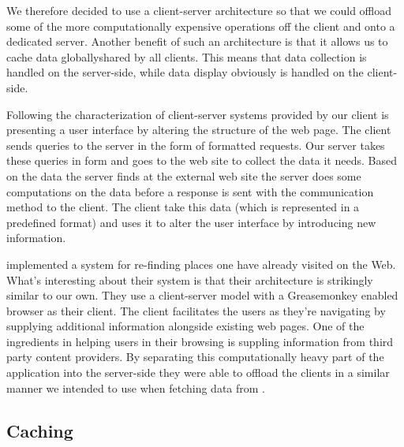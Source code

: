 We therefore decided to use a client-server architecture so that we could
offload some of the more computationally expensive operations off the client
and onto a dedicated server. Another benefit of such an architecture is that
it allows us to cache data globally\dash{}shared by all clients. This means
that data collection is handled on the server-side, while data display
obviously is handled on the client-side.

Following the characterization of client-server systems provided by
\citeauthor{sinha92} our client is presenting a user interface
by altering the structure of the \urort{} web page. The client sends queries
to the server in the form of %
formatted requests. Our server takes these queries in  form
and goes to the \urort{} web site to collect the data it needs. Based on the
data the server finds at the external \urort{} web site the server does some
computations on the data before a response is sent
with the  communication method to the client. The client take this
data (which is represented in a predefined format) and uses it to alter the
user interface by introducing new information.

\citet[--888]{nishimoto06} implemented a system for re-finding places
one have already visited on the Web. What's interesting about their system is
that their architecture is strikingly similar to our own. They use a
client-server model with a Greasemonkey enabled browser as their client. The
client facilitates the users as they're navigating by supplying additional
information alongside existing web pages. One of the ingredients in helping
users in their browsing is suppling information from third party content
providers. By separating this computationally heavy part of the application
into the server-side they were able to offload the clients in a similar
manner we intended to use when fetching data from \urort{}.

\subsection{Caching}
\label{section:implementation.architecture.caching}

